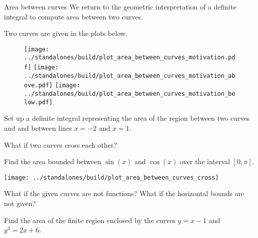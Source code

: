 \documentclass[../main.tex]{subfiles}
\begin{document}
\begin{lesson}{Area between curves}
  We return to the geometric interpretation of a definite integral to compute area between two curves.

  \begin{example}
    Two curves are given in the plots below. 
    \begin{figure}[H]
      \centering
      \texttt{[image: ../standalones/build/plot\_area\_between\_curves\_motivation.pdf]}
      \hspace{1em}
      \texttt{[image: ../standalones/build/plot\_area\_between\_curves\_motivation\_above.pdf]}
      \hspace{2em}
      \texttt{[image: ../standalones/build/plot\_area\_between\_curves\_motivation\_below.pdf]}
    \end{figure}

    Set up a definite integral representing the area of the region between two curves  and  and between lines \(x = -2\) and \(x = 1\).


  \end{example}

  What if two curves cross each other?
  \begin{example}
    Find the area bounded between \(\sin(x)\) and \(\cos(x)\) over the interval \([0, \pi]\).

    \texttt{[image: ../standalones/build/plot\_area\_between\_curves\_cross]}

  \end{example}

  What if the given curves are not functions? What if the horizontal bounds are not given?
  \begin{example}
    Find the area of the finite region enclosed by the curves \(y = x - 1\) and \(y^{2} = 2x + 6\).


\end{example}
\end{lesson}
\end{document}
